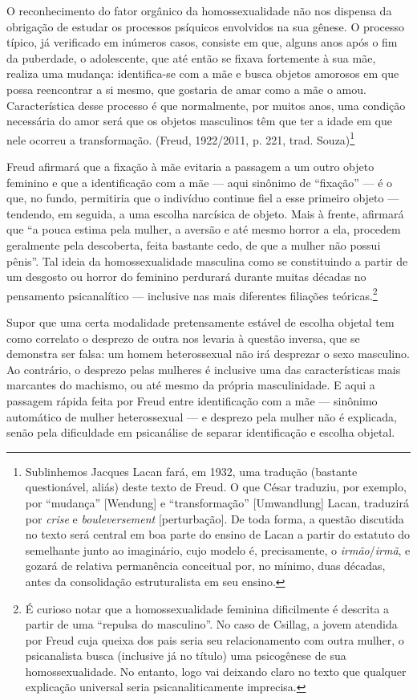 O reconhecimento do fator orgânico da homossexualidade não nos dispensa
da obrigação de estudar os processos psíquicos envolvidos na sua gênese.
O processo típico, já verificado em inúmeros casos, consiste em que,
alguns anos após o fim da puberdade, o adolescente, que até então se
fixava fortemente à sua mãe, realiza uma mudança: identifica-se com a
mãe e busca objetos amorosos em que possa reencontrar a si mesmo, que
gostaria de amar como a mãe o amou. Característica desse processo é que
normalmente, por muitos anos, uma condição necessária do amor será que
os objetos masculinos têm que ter a idade em que nele ocorreu a
transformação. (Freud, 1922/2011, p. 221, trad. Souza)\footnote{Sublinhemos
  Jacques Lacan fará, em 1932, uma tradução (bastante questionável,
  aliás) deste texto de Freud. O que César traduziu, por exemplo, por
  ``mudança'' {[}Wendung{]} e ``transformação'' {[}Umwandlung{]} Lacan,
  traduzirá por \emph{crise} e \emph{bouleversement} {[}perturbação{]}.
  De toda forma, a questão discutida no texto será central em boa parte
  do ensino de Lacan a partir do estatuto do semelhante junto ao
  imaginário, cujo modelo é, precisamente, o \emph{irmão}/\emph{irmã}, e
  gozará de relativa permanência conceitual por, no mínimo, duas
  décadas, antes da consolidação estruturalista em seu ensino.}

Freud afirmará que a fixação à mãe evitaria a passagem a um outro objeto
feminino e que a identificação com a mãe --- aqui sinônimo de
``fixação'' --- é o que, no fundo, permitiria que o indivíduo continue
fiel a esse primeiro objeto --- tendendo, em seguida, a uma escolha
narcísica de objeto. Mais à frente, afirmará que ``a pouca estima pela
mulher, a aversão e até mesmo horror a ela, procedem geralmente pela
descoberta, feita bastante cedo, de que a mulher não possui pênis''. Tal
ideia da homossexualidade masculina como se constituindo a partir de um
desgosto ou horror do feminino perdurará durante muitas décadas no
pensamento psicanalítico --- inclusive nas mais diferentes filiações
teóricas.\footnote{É curioso notar que a homossexualidade feminina
  dificilmente é descrita a partir de uma ``repulsa do masculino''. No
  caso de Csillag, a jovem atendida por Freud cuja queixa dos pais seria
  seu relacionamento com outra mulher, o psicanalista busca (inclusive
  já no título) uma psicogênese de sua homossexualidade. No entanto,
  logo vai deixando claro no texto que qualquer explicação universal
  seria psicanaliticamente imprecisa.}

Supor que uma certa modalidade pretensamente estável de escolha objetal
tem como correlato o desprezo de outra nos levaria à questão inversa,
que se demonstra ser falsa: um homem heterossexual não irá desprezar o
sexo masculino. Ao contrário, o desprezo pelas mulheres é inclusive uma
das características mais marcantes do machismo, ou até mesmo da própria
masculinidade. E aqui a passagem rápida feita por Freud entre
identificação com a mãe --- sinônimo automático de mulher heterossexual
--- e desprezo pela mulher não é explicada, senão pela dificuldade em
psicanálise de separar identificação e escolha objetal.

